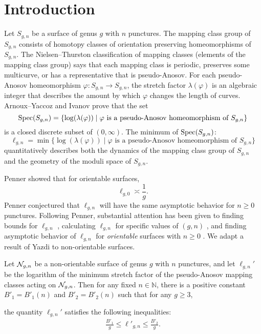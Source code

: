 \section{Introduction}
\label{sec:introduction}


Let $S_{g,n}$ be a surface of genus $g$ with $n$ punctures.  The mapping class group of $S_{g,n}$ consists of homotopy classes of orientation preserving homeomorphisms of $S_{g,n}$.  The Nielsen--Thurston classification of mapping classes (elements of the mapping class group) says that each mapping class is periodic, preserves some multicurve, or has a representative that is pseudo-Anosov.  For each pseudo-Anosov homeomorphism $\varphi:S_{g,n}\rightarrow S_{g,n}$, the stretch factor $\lambda(\varphi)$ is an algebraic integer that describes the amount by which $\varphi$ changes the length of curves.  Arnoux--Yaccoz \cite{AY} and Ivanov \cite{ivanov} prove that the set
$$\operatorname{Spec}(S_{g,n})=\{\log(\lambda(\varphi)) \mid \varphi \text{ is a pseudo-Anosov homeomorphism of }S_{g,n}\}$$ is a closed discrete subset of $(0,\infty)$. The minimum of $\operatorname{Spec}(S_{g,n})$:
$$\ell_{g,n}=\min\{\log(\lambda(\varphi)) \mid \varphi \text{ is a pseudo-Anosov homeomorphism of }S_{g,n}\}$$ quantitatively describes both the dynamics of the mapping class group of $S_{g,n}$ and the geometry of the moduli space of $S_{g,n}$.

Penner \cite{penner1991bounds} showed that for orientable surfaces, $$\ell_{g,0}\asymp \frac{1}{g}.$$ 
  Penner conjectured that $\ell_{g,n}$ will have the same asymptotic behavior for  $n\geq0$ punctures.  Following Penner, substantial attention has been given to finding bounds for $\ell_{g,n}$ \cite{AD,bauer,hironaka,HK,HK20,KT,Loving,minakawa}, calculating $\ell_{g,n}$ for specific values of $(g,n)$ \cite{CH,HS,LT,SKL}, and finding asymptotic behavior of $\ell_{g,n}$ for {\it orientable} surfaces with $n\geq 0$ \cite{KT,tsai2009asymptotic,valdivia,yazdi2018pseudo}.  We adapt a result of Yazdi \cite{yazdi2018pseudo} to non-orientable surfaces. 

\begin{thm}\label{thm:stretch1}
  Let $\mathcal{N}_{g,n}$ be a non-orientable surface of genus $g$ with $n$ punctures, and let $\ell_{g,n}'$ be the logarithm of
  the minimum stretch factor of the pseudo-Anosov mapping classes acting on $\mathcal{N}_{g,n}$.
  Then for any fixed $n \in \mathbb{N}$, there is a positive constant $B'_1 = B'_1(n)$ and $B'_2 = B'_2(n)$ such
  that for any $g \geq 3$,

  the quantity $\ell_{g,n}'$ satisfies the following inequalities:
  \begin{align*}
    \frac{B'_1}{g} \leq \ell'_{g,n} \leq \frac{B'_2}{g}.
  \end{align*}
\end{thm}



